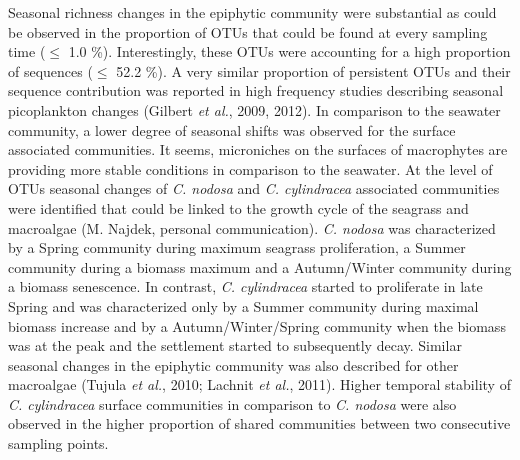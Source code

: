 \documentclass[12pt,]{article}
\begin{document}
Seasonal richness changes in the epiphytic community were substantial as
could be observed in the proportion of OTUs that could be found at every
sampling time (\(\leq\) 1.0 \si{\percent}). Interestingly, these OTUs
were accounting for a high proportion of sequences (\(\leq\) 52.2
\si{\percent}). A very similar proportion of persistent OTUs and their
sequence contribution was reported in high frequency studies describing
seasonal picoplankton changes (Gilbert \emph{et al.}, 2009, 2012). In
comparison to the seawater community, a lower degree of seasonal shifts
was observed for the surface associated communities. It seems,
microniches on the surfaces of macrophytes are providing more stable
conditions in comparison to the seawater. At the level of OTUs seasonal
changes of \emph{C. nodosa} and \emph{C. cylindracea} associated
communities were identified that could be linked to the growth cycle of
the seagrass and macroalgae (M. Najdek, personal communication).
\emph{C. nodosa} was characterized by a Spring community during maximum
seagrass proliferation, a Summer community during a biomass maximum and
a Autumn/Winter community during a biomass senescence. In contrast,
\emph{C. cylindracea} started to proliferate in late Spring and was
characterized only by a Summer community during maximal biomass increase
and by a Autumn/Winter/Spring community when the biomass was at the peak
and the settlement started to subsequently decay. Similar seasonal
changes in the epiphytic community was also described for other
macroalgae (Tujula \emph{et al.}, 2010; Lachnit \emph{et al.}, 2011).
Higher temporal stability of \emph{C. cylindracea} surface communities
in comparison to \emph{C. nodosa} were also observed in the higher
proportion of shared communities between two consecutive sampling
points.
\end{document}
